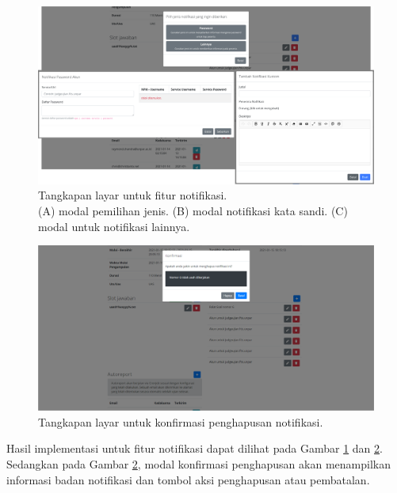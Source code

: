     \begin{figure}
        \centering
        \includegraphics[width=0.7\paperwidth]{Gambar/implemented-interface/admin/ujian-notifikasi.png}
        \caption{Tangkapan layar untuk fitur notifikasi. \\ (A) modal pemilihan jenis. (B) modal notifikasi kata sandi. (C) modal untuk notifikasi lainnya.}
        \label{fig:screenshot-admin-notif}
    \end{figure}
    \begin{figure}
        \centering
        \includegraphics[width=0.7\paperwidth]{Gambar/implemented-interface/admin/ujian-notifikasi-delete.png}
        \caption{Tangkapan layar untuk konfirmasi penghapusan notifikasi.}
        \label{fig:screenshot-admin-notif-delete}
    \end{figure}
    Hasil implementasi untuk fitur notifikasi dapat dilihat pada Gambar \ref{fig:screenshot-admin-notif} dan
    \ref{fig:screenshot-admin-notif-delete}.
    Sedangkan pada Gambar \ref{fig:screenshot-admin-notif-delete}, modal konfirmasi penghapusan akan menampilkan
    informasi badan notifikasi dan tombol aksi penghapusan atau pembatalan.
    
